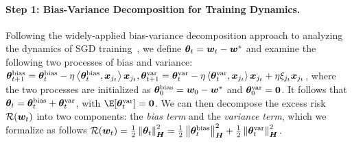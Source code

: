 \paragraph{Step 1: Bias-Variance Decomposition for Training Dynamics.} \label{step:bias-var-decomposition} 
Following the widely-applied bias-variance decomposition approach to analyzing the dynamics of SGD training~\citep{neu2018iterate, ge2019step, zou2021benign, wu2022iterateriskboundssgd}, we define ${\bm{\theta}}_t = {\bm{w}}_t - {\bm{w}}^*$ and examine the following two processes of bias and variance: ${\bm{\theta}}_{t+1}^{\mathrm{bias}} = {\bm{\theta}}_t^{\mathrm{bias}} - \eta \left\langle {\bm{\theta}}_t^{\mathrm{bias}},{\bm{x}}_{j_t}\right\rangle{\bm{x}}_{j_t}, {\bm{\theta}}_{t+1}^{\mathrm{var}} = {\bm{\theta}}_t^{\mathrm{var}} - \eta \left\langle {\bm{\theta}}_t^{\mathrm{var}},{\bm{x}}_{j_t}\right\rangle{\bm{x}}_{j_t} + \eta \xi_{j_t}{\bm{x}}_{j_t}$,
where the two processes are initialized as ${\bm{\theta}}_0^{\mathrm{bias}} = {\bm{w}}_0 - {\bm{w}}^*$ and ${\bm{\theta}}_0^{\mathrm{var}} = \boldsymbol{0}$.
It follows that ${\bm{\theta}}_t = {\bm{\theta}}_t^{\mathrm{bias}} + {\bm{\theta}}_t^{\mathrm{var}}$, with $\E[\vtheta_t^{\text{var}}] = \boldsymbol{0}$. We can then decompose the excess risk $\mathcal{R}({\bm{w}}_t)$ into two components: the \textit{bias term} and the \textit{variance term}, which we formalize as follows $\mathcal{R}({\bm{w}}_t) = \frac{1}{2}\left\|{\bm{\theta}}_{t}\right\|_{{\bm{H}}}^2 =  \frac{1}{2}\left\|{\bm{\theta}}_t^{\mathrm{bias}}\right\|_{{\bm{H}}}^2 + \frac{1}{2}\left\|{\bm{\theta}}_t^{\mathrm{var}}\right\|_{{\bm{H}}}^2.$

